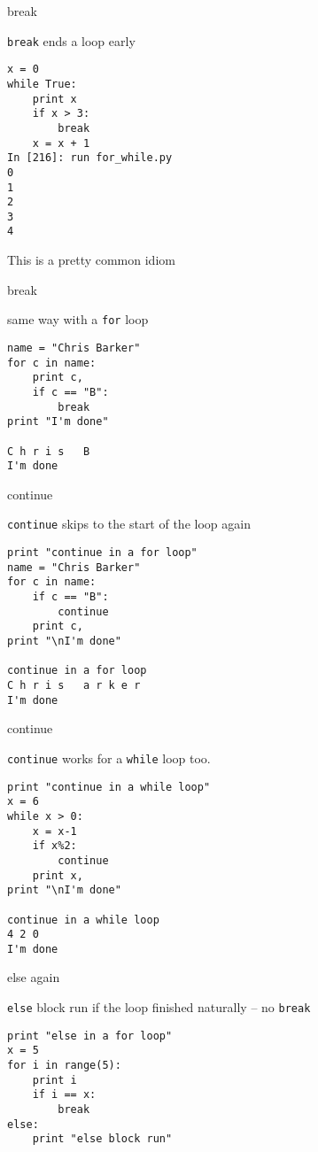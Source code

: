 \documentclass{beamer}
\begin{document}
\begin{frame}[fragile]{break}

{\Large \verb|break| ends a loop early}

\begin{verbatim}
x = 0
while True:
    print x
    if x > 3:
        break
    x = x + 1
In [216]: run for_while.py
0
1
2
3
4
\end{verbatim}

This is a pretty common idiom

\end{frame}

\begin{frame}[fragile]{break}

{\Large same way with a \verb|for| loop }

\begin{verbatim}
name = "Chris Barker"
for c in name:
    print c,
    if c == "B":
        break
print "I'm done"

C h r i s   B 
I'm done
\end{verbatim}
\end{frame}

\begin{frame}[fragile]{continue}

{\Large \verb|continue| skips to the start of the loop again}

\begin{verbatim}
print "continue in a for loop"
name = "Chris Barker"
for c in name:
    if c == "B":
        continue
    print c,
print "\nI'm done"

continue in a for loop
C h r i s   a r k e r 
I'm done
\end{verbatim}
\end{frame}

\begin{frame}[fragile]{continue}

{\Large \verb|continue| works for a \verb|while| loop too.}

\begin{verbatim}
print "continue in a while loop"
x = 6
while x > 0:
    x = x-1
    if x%2:
        continue
    print x,
print "\nI'm done"

continue in a while loop
4 2 0 
I'm done
\end{verbatim}
\end{frame}

\begin{frame}[fragile]{else again}

{\Large \verb|else| block run if the loop finished naturally -- no \verb|break|}

\begin{verbatim}
print "else in a for loop"
x = 5
for i in range(5):
    print i
    if i == x:
        break
else:
    print "else block run"

\end{verbatim}
\end{frame}
\end{document}
